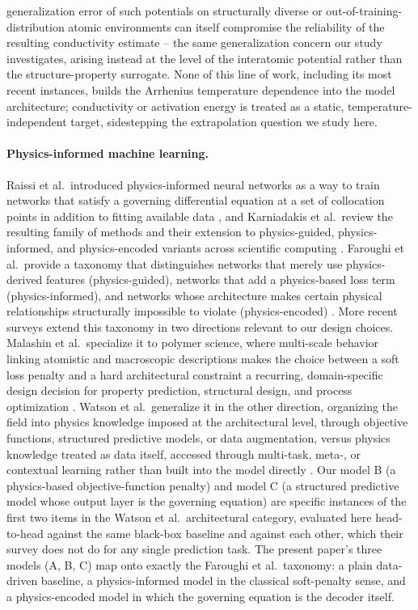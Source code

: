 \documentclass[11pt]{article}
\begin{document}
generalization error of such potentials on structurally diverse or out-of-training-distribution atomic environments can itself compromise the reliability of the resulting conductivity estimate \citep{maevskiy2025potential} -- the same generalization concern our study investigates, arising instead at the level of the interatomic potential rather than the structure-property surrogate. None of this line of work, including its most recent instances, builds the Arrhenius temperature dependence into the model architecture; conductivity or activation energy is treated as a static, temperature-independent target, sidestepping the extrapolation question we study here.

\paragraph{Physics-informed machine learning.} Raissi et al.\ introduced physics-informed neural networks as a way to train networks that satisfy a governing differential equation at a set of collocation points in addition to fitting available data \citep{raissi2019pinn}, and Karniadakis et al.\ review the resulting family of methods and their extension to physics-guided, physics-informed, and physics-encoded variants across scientific computing \citep{karniadakis2021piml}. Faroughi et al.\ provide a taxonomy that distinguishes networks that merely use physics-derived features (physics-guided), networks that add a physics-based loss term (physics-informed), and networks whose architecture makes certain physical relationships structurally impossible to violate (physics-encoded) \citep{faroughi2024pgnn}. More recent surveys extend this taxonomy in two directions relevant to our design choices. Malashin et al.\ specialize it to polymer science, where multi-scale behavior linking atomistic and macroscopic descriptions makes the choice between a soft loss penalty and a hard architectural constraint a recurring, domain-specific design decision for property prediction, structural design, and process optimization \citep{malashin2025polymers}. Watson et al.\ generalize it in the other direction, organizing the field into physics knowledge imposed at the architectural level, through objective functions, structured predictive models, or data augmentation, versus physics knowledge treated as data itself, accessed through multi-task, meta-, or contextual learning rather than built into the model directly \citep{watson2024survey}. Our model B (a physics-based objective-function penalty) and model C (a structured predictive model whose output layer is the governing equation) are specific instances of the first two items in the Watson et al.\ architectural category, evaluated here head-to-head against the same black-box baseline and against each other, which their survey does not do for any single prediction task. The present paper's three models (A, B, C) map onto exactly the Faroughi et al.\ taxonomy: a plain data-driven baseline, a physics-informed model in the classical soft-penalty sense, and a physics-encoded model in which the governing equation is the decoder itself.
\end{document}
